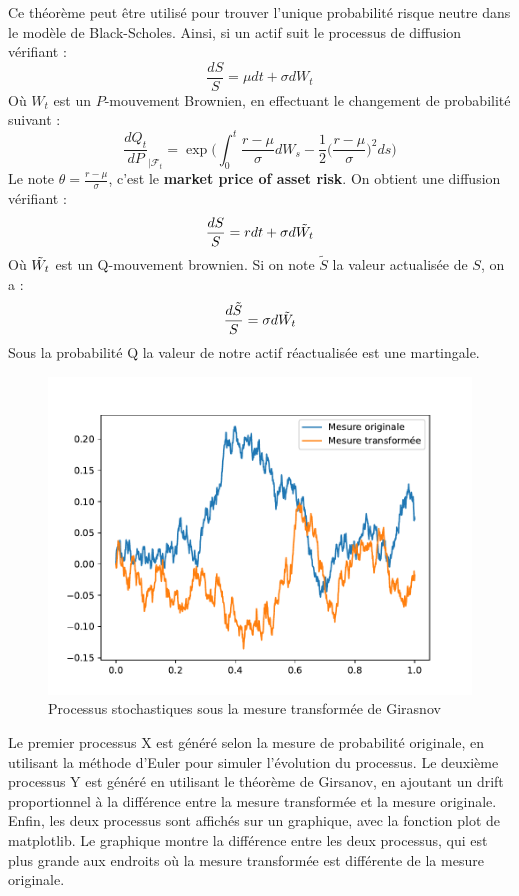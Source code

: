 \documentclass[a4paper]{article}
\begin{document}
\vspace{2mm} 
Ce théorème peut être utilisé pour trouver l'unique probabilité risque neutre dans le modèle de Black-Scholes. Ainsi, si un actif suit le processus de diffusion vérifiant : 
\begin{equation}
    \frac{dS}{S} = \mu dt + \sigma dW_t
\end{equation}
Où $W_t$ est un $P$-mouvement Brownien, en effectuant le changement de probabilité suivant : 
\begin{equation}
    \frac{dQ_t}{dP}_{|\mathcal{F}_t} = \exp{ \bigg(  \int_{0}^{t} \frac{r-\mu}{\sigma}dW_s -\frac{1}{2}\bigg( \frac{r-\mu}{\sigma}\bigg)^2 ds\bigg)}
\end{equation}
Le note $\theta = \frac{r-\mu}{\sigma}$, c'est le \textbf{market price of asset risk}.
On obtient une diffusion vérifiant :
\begin{equation}
    \frac{dS}{S} = r dt + \sigma d \Tilde{W_t}
\end{equation}
Où $\Tilde{W_t}$ est un Q-mouvement brownien. Si on note $\tilde{S}$ la valeur actualisée de $S$, on a :
\begin{equation}
    \frac{d\Tilde{S}}{S} = \sigma d \Tilde{W_t}
\end{equation}
Sous la probabilité Q la valeur de notre actif réactualisée est une martingale.
\begin{figure}[H]
\centering
    \includegraphics[scale=0.6]{girsqnov.pdf}
    \caption{Processus stochastiques sous la mesure transformée de Girasnov}
    \label{fig:my_label}
\end{figure} 
Le premier processus X est généré selon la mesure de probabilité originale, en utilisant la méthode d'Euler pour simuler l'évolution du processus.
Le deuxième processus Y est généré en utilisant le théorème de Girsanov, en ajoutant un drift proportionnel à la différence entre la mesure transformée et la mesure originale.
Enfin, les deux processus sont affichés sur un graphique, avec la fonction plot de matplotlib. Le graphique montre la différence entre les deux processus, qui est plus grande aux endroits où la mesure transformée est différente de la mesure originale. 
\end{document}
